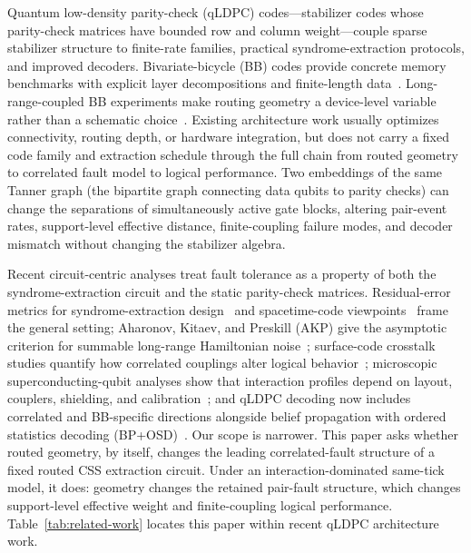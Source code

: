 \documentclass[
aps,
prx,
10pt,
twocolumn,
groupedaddress,
longbibliography,
nofootinbib,
floatfix
]{revtex4-2}
\theoremstyle{definition}
\begin{document}
Quantum low-density parity-check (qLDPC) codes---stabilizer codes whose parity-check matrices have bounded row and column weight---couple sparse stabilizer structure to finite-rate families, practical syndrome-extraction protocols, and improved decoders. Bivariate-bicycle (BB) codes provide concrete memory benchmarks with explicit layer decompositions and finite-length data~\cite{calderbank_shor_1996,steane_1996,breuckmann_eberhardt_2021,bravyi_memory_2024}. Long-range-coupled BB experiments make routing geometry a device-level variable rather than a schematic choice~\cite{wang_demo_2025}. Existing architecture work usually optimizes connectivity, routing depth, or hardware integration, but does not carry a fixed code family and extraction schedule through the full chain from routed geometry to correlated fault model to logical performance. Two embeddings of the same Tanner graph (the bipartite graph connecting data qubits to parity checks) can change the separations of simultaneously active gate blocks, altering pair-event rates, support-level effective distance, finite-coupling failure modes, and decoder mismatch without changing the stabilizer algebra.

Recent circuit-centric analyses treat fault tolerance as a property of both the syndrome-extraction circuit and the static parity-check matrices. Residual-error metrics for syndrome-extraction design~\cite{strikis_sec_2026} and spacetime-code viewpoints~\cite{aitchison_beri_2025,pesah_spacetime_2025} frame the general setting; Aharonov, Kitaev, and Preskill (AKP) give the asymptotic criterion for summable long-range Hamiltonian noise~\cite{akp_2006}; surface-code crosstalk studies quantify how correlated couplings alter logical behavior~\cite{zhou_crosstalk_2025}; microscopic superconducting-qubit analyses show that interaction profiles depend on layout, couplers, shielding, and calibration~\cite{pettersson_zz_2024,aguila_flux_2025}; and qLDPC decoding now includes correlated and BB-specific directions alongside belief propagation with ordered statistics decoding (BP+OSD)~\cite{roffe_bp_osd_2020,ducrest_capbp_2024,hillmann_lsd_2025,mueller_relaybp_2025,maan_correlated_2026,sahay_matching_2026}. Our scope is narrower. This paper asks whether routed geometry, by itself, changes the leading correlated-fault structure of a fixed routed CSS extraction circuit. Under an interaction-dominated same-tick model, it does: geometry changes the retained pair-fault structure, which changes support-level effective weight and finite-coupling logical performance. Table~\ref{tab:related-work} locates this paper within recent qLDPC architecture work.
\end{document}
